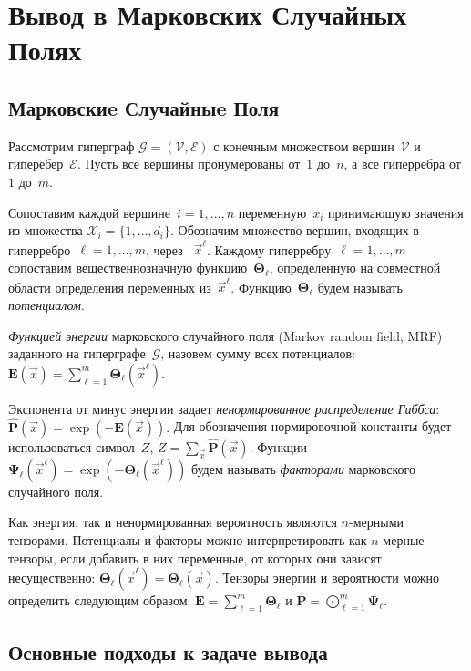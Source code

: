 \chapter{Вывод в Марковских Случайных Полях} \label{chap:mrf}
\section{Марковскиe Случайныe Поля} \label{sec:mrf}

Рассмотрим гиперграф $\mathcal{G} = (\mathcal{V}, \mathcal{E})$ с конечным множеством вершин~$\mathcal{V}$ и гиперебер~$\mathcal{E}$.
Пусть все вершины пронумерованы от~$1$ до~$n$, а все гиперребра от~$1$ до~$m$.

Сопоставим каждой вершине~$i = 1,\ldots,n$ переменную~$x_i$ принимающую значения из множества $\mathcal{X}_i = \{1,\dots,d_i\}$.
Обозначим множество вершин, входящих в гиперребро~$\ell = 1, \ldots, m$, через ~$\vec{x}^\ell$.
Каждому гиперребру~$\ell = 1, \ldots, m$ сопоставим вещественнозначную функцию~$\mathbf{\Theta}_\ell$, определенную на совместной области определения переменных из~$\vec{x}^\ell$. Функцию~$\mathbf{\Theta}_\ell$ будем называть \emph{потенциалом}.

\emph{Функцией энергии} марковского случайного поля (Markov random field, MRF) заданного на гиперграфе~$\mathcal{G}$, назовем сумму всех потенциалов:
$
\mathbf{E}(\vec{x}) = \sum_{\ell = 1}^{m} \mathbf{\Theta}_\ell(\vec{x}^{\ell}).
$

Экспонента от минус энергии задает \emph{ненормированное распределение Гиббса}:
$
\widehat{\mathbf{P}}(\vec{x}) = \exp(-\mathbf{E}(\vec{x})).
$
Для обозначения нормировочной константы будет использоваться символ~$Z$, $Z = \sum_{\vec{x}} \widehat{\mathbf{P}}(\vec{x})$. Функции $\mathbf{\Psi}_\ell(\vec{x}^\ell) = \exp(-\mathbf{\Theta}_\ell(\vec{x}^{\ell}))$ будем называть \emph{факторами} марковского случайного поля.

Как энергия, так и ненормированная вероятность являются $n$-мерными тензорами. Потенциалы и факторы можно интерпретировать как $n$-мерные тензоры, если добавить в них переменные, от которых они зависят несущественно: $\mathbf{\Theta}_\ell (\vec{x}^\ell) = \mathbf{\Theta}_\ell (\vec{x})$. Тензоры энергии и вероятности можно определить следующим образом:
$
\mathbf{E} = \sum_{\ell = 1}^m \mathbf{\Theta}_\ell
$
и
$
\widehat{\mathbf{P}} =   \bigodot_{\ell = 1}^m \mathbf{\Psi}_\ell.
$
\section{Основные подходы к задаче вывода} \label{sec:mrf-approaches}

